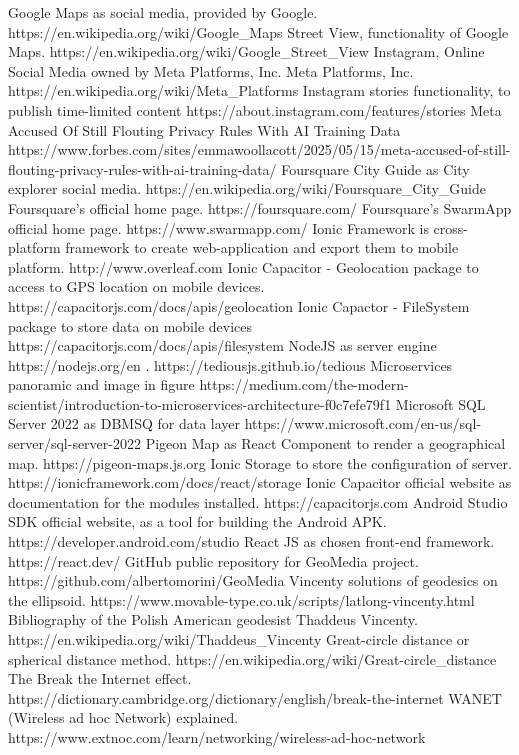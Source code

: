 \documentclass[conference]{IEEEtran}
\begin{document}
\begin{thebibliography}{00}
 Google Maps as social media, provided by Google. https://en.wikipedia.org/wiki/Google\_Maps
 Street View, functionality of Google Maps.
https://en.wikipedia.org/wiki/Google\_Street\_View
 Instagram, Online Social Media owned by Meta Platforms, Inc.
 Meta Platforms, Inc.
https://en.wikipedia.org/wiki/Meta\_Platforms
 Instagram stories functionality, to publish time-limited content
https://about.instagram.com/features/stories
Meta Accused Of Still Flouting Privacy Rules With AI Training Data
https://www.forbes.com/sites/emmawoollacott/2025/05/15/meta-accused-of-still-flouting-privacy-rules-with-ai-training-data/
 Foursquare City Guide as City explorer social media.
https://en.wikipedia.org/wiki/Foursquare\_City\_Guide
 Foursquare's official home page.
https://foursquare.com/
 Foursquare's SwarmApp official home page.
https://www.swarmapp.com/
 Ionic Framework is cross-platform framework to create web-application and export them to mobile platform. http://www.overleaf.com
 Ionic Capacitor - Geolocation package to access to GPS location on mobile devices. https://capacitorjs.com/docs/apis/geolocation
Ionic Capactor - FileSystem package to store data on mobile devices https://capacitorjs.com/docs/apis/filesystem
 NodeJS as server engine https://nodejs.org/en
. https://tediousjs.github.io/tedious
 Microservices panoramic and image in figure https://medium.com/the-modern-scientist/introduction-to-microservices-architecture-f0c7efe79f1
 Microsoft SQL Server 2022 as DBMSQ for data layer https://www.microsoft.com/en-us/sql-server/sql-server-2022
 Pigeon Map as React Component to render a geographical map. https://pigeon-maps.js.org
Ionic Storage to store the configuration of server. https://ionicframework.com/docs/react/storage
Ionic Capacitor official website as documentation for the modules installed. https://capacitorjs.com
Android Studio SDK official website, as a tool for building the Android APK. https://developer.android.com/studio
React JS as chosen front-end framework. https://react.dev/
GitHub public repository for GeoMedia project. https://github.com/albertomorini/GeoMedia
 Vincenty solutions of geodesics on the ellipsoid. 
https://www.movable-type.co.uk/scripts/latlong-vincenty.html
 Bibliography of the Polish American geodesist Thaddeus Vincenty. https://en.wikipedia.org/wiki/Thaddeus\_Vincenty
Great-circle distance or spherical distance method.
https://en.wikipedia.org/wiki/Great-circle\_distance
 The Break the Internet effect. 
https://dictionary.cambridge.org/dictionary/english/break-the-internet
 WANET (Wireless ad hoc Network) explained.
https://www.extnoc.com/learn/networking/wireless-ad-hoc-network
\end{thebibliography}

\vspace{12pt}
\end{document}
